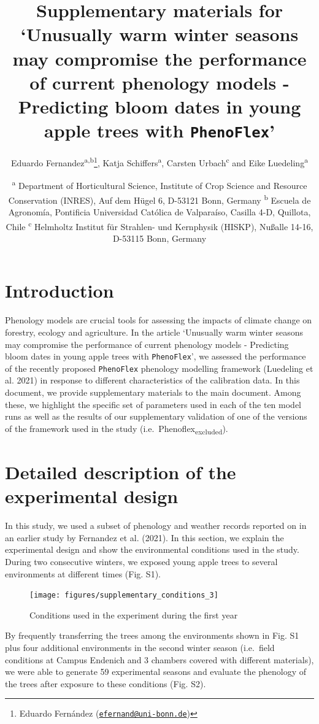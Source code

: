 \documentclass[
]{article}
\title{Supplementary materials for `Unusually warm winter seasons may
compromise the performance of current phenology models - Predicting
bloom dates in young apple trees with \texttt{PhenoFlex}'}
\author{Eduardo Fernandez\textsuperscript{a,b}\footnote{Eduardo
  Fernández
  (\href{mailto:efernand@uni-bonn.de}{\nolinkurl{efernand@uni-bonn.de}})},
Katja Schiffers\textsuperscript{a}, Carsten Urbach\textsuperscript{c}
and Eike Luedeling\textsuperscript{a}}
\date{\textsuperscript{a} Department of Horticultural Science, Institute
of Crop Science and Resource Conservation (INRES), Auf dem Hügel 6,
D-53121 Bonn, Germany \newline \textsuperscript{b} Escuela de Agronomía,
Pontificia Universidad Católica de Valparaíso, Casilla 4-D, Quillota,
Chile \newline \textsuperscript{c} Helmholtz Institut für Strahlen- und
Kernphysik (HISKP), Nußalle 14-16, D-53115 Bonn, Germany}
\begin{document}
\maketitle

\hypertarget{introduction}{%
\section{Introduction}\label{introduction}}

Phenology models are crucial tools for assessing the impacts of climate
change on forestry, ecology and agriculture. In the article `Unusually
warm winter seasons may compromise the performance of current phenology
models - Predicting bloom dates in young apple trees with
\texttt{PhenoFlex}', we assessed the performance of the recently
proposed \texttt{PhenoFlex} phenology modelling framework (Luedeling et
al. 2021) in response to different characteristics of the calibration
data. In this document, we provide supplementary materials to the main
document. Among these, we highlight the specific set of parameters used
in each of the ten model runs as well as the results of our
supplementary validation of one of the versions of the framework used in
the study (i.e.~Phenoflex\textsubscript{excluded}).

\hypertarget{detailed-description-of-the-experimental-design}{%
\section{Detailed description of the experimental
design}\label{detailed-description-of-the-experimental-design}}

In this study, we used a subset of phenology and weather records
reported on in an earlier study by Fernandez et al. (2021). In this
section, we explain the experimental design and show the environmental
conditions used in the study. During two consecutive winters, we exposed
young apple trees to several environments at different times (Fig. S1).

\begin{figure}

{\centering \texttt{[image: figures/supplementary\_conditions\_3]} 

}

\caption{Conditions used in the experiment during the first year}\label{fig:fig_s1}
\end{figure}

By frequently transferring the trees among the environments shown in
Fig. S1 plus four additional environments in the second winter season
(i.e.~field conditions at Campus Endenich and 3 chambers covered with
different materials), we were able to generate 59 experimental seasons
and evaluate the phenology of the trees after exposure to these
conditions (Fig. S2).
\end{document}
